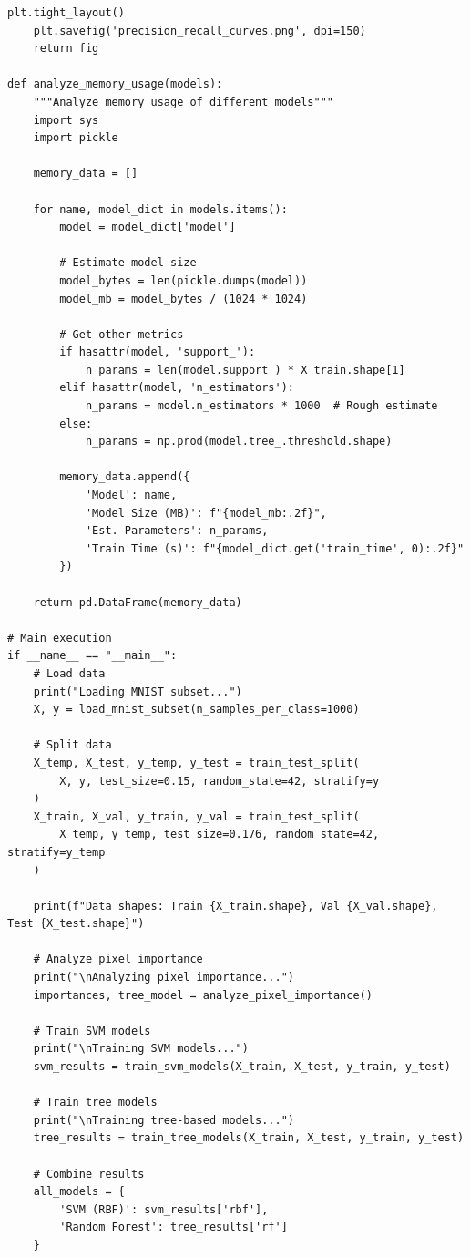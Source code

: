 \documentclass[12pt,a4paper]{article}
\theoremstyle{definition}
\begin{document}
\begin{lstlisting}[caption={MNIST Classification Implementation}]
    plt.tight_layout()
    plt.savefig('precision_recall_curves.png', dpi=150)
    return fig

def analyze_memory_usage(models):
    """Analyze memory usage of different models"""
    import sys
    import pickle
    
    memory_data = []
    
    for name, model_dict in models.items():
        model = model_dict['model']
        
        # Estimate model size
        model_bytes = len(pickle.dumps(model))
        model_mb = model_bytes / (1024 * 1024)
        
        # Get other metrics
        if hasattr(model, 'support_'):
            n_params = len(model.support_) * X_train.shape[1]
        elif hasattr(model, 'n_estimators'):
            n_params = model.n_estimators * 1000  # Rough estimate
        else:
            n_params = np.prod(model.tree_.threshold.shape)
        
        memory_data.append({
            'Model': name,
            'Model Size (MB)': f"{model_mb:.2f}",
            'Est. Parameters': n_params,
            'Train Time (s)': f"{model_dict.get('train_time', 0):.2f}"
        })
    
    return pd.DataFrame(memory_data)

# Main execution
if __name__ == "__main__":
    # Load data
    print("Loading MNIST subset...")
    X, y = load_mnist_subset(n_samples_per_class=1000)
    
    # Split data
    X_temp, X_test, y_temp, y_test = train_test_split(
        X, y, test_size=0.15, random_state=42, stratify=y
    )
    X_train, X_val, y_train, y_val = train_test_split(
        X_temp, y_temp, test_size=0.176, random_state=42, stratify=y_temp
    )
    
    print(f"Data shapes: Train {X_train.shape}, Val {X_val.shape}, Test {X_test.shape}")
    
    # Analyze pixel importance
    print("\nAnalyzing pixel importance...")
    importances, tree_model = analyze_pixel_importance()
    
    # Train SVM models
    print("\nTraining SVM models...")
    svm_results = train_svm_models(X_train, X_test, y_train, y_test)
    
    # Train tree models
    print("\nTraining tree-based models...")
    tree_results = train_tree_models(X_train, X_test, y_train, y_test)
    
    # Combine results
    all_models = {
        'SVM (RBF)': svm_results['rbf'],
        'Random Forest': tree_results['rf']
    }
    

\end{lstlisting}
\end{document}
